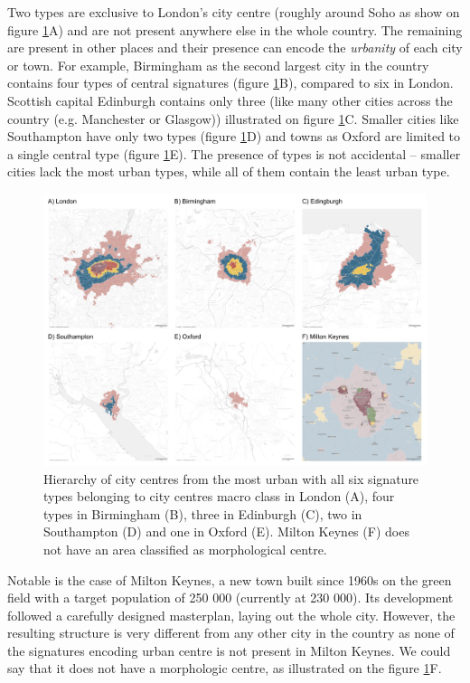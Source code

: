 Two types are exclusive to London's city centre (roughly around Soho as show on figure
\ref{fig:centres}A) and are not present anywhere else in the whole country. The
remaining are present in other places and their presence can encode the
\textit{urbanity} of each city or town. For example, Birmingham as the second largest
city in the country contains four types of central signatures (figure
\ref{fig:centres}B), compared to six in London. Scottish capital Edinburgh contains only
three (like many other cities across the country (e.g. Manchester or Glasgow))
illustrated on figure \ref{fig:centres}C. Smaller cities like Southampton have only two
types (figure \ref{fig:centres}D) and towns as Oxford are limited to a single central
type (figure \ref{fig:centres}E). The presence of types is not accidental -- smaller
cities lack the most urban types, while all of them contain the least urban type.

\begin{figure}
    \includegraphics[width=0.75\linewidth, center]{fig/centres.png}
    \caption{Hierarchy of city centres from the most urban with all six signature types
    belonging to city centres macro class in London (A), four types in Birmingham (B),
    three in Edinburgh (C), two in Southampton (D) and one in Oxford (E). Milton Keynes
    (F) does not have an area classified as morphological centre.}
    \label{fig:centres}
\end{figure}

Notable is the case of Milton Keynes, a new town built since 1960s on the green field
with a target population of 250 000 (currently at 230 000). Its development followed a
carefully designed masterplan, laying out the whole city. However, the resulting
structure is very different from any other city in the country as none of the signatures
encoding urban centre is not present in Milton Keynes. We could say that it does not
have a morphologic centre, as illustrated on the figure \ref{fig:centres}F.
